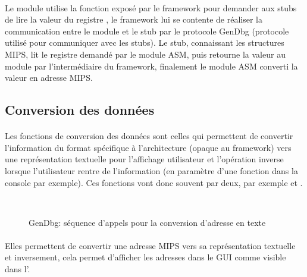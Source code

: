 \documentclass[11pt, book, english, french, standardlists]{upmethodology-document}
\begin{document}
				\paragraph*{}
					Le module utilise la fonction  exposé par le framework pour demander aux stubs de lire la valeur du registre , le framework lui se contente de réaliser la communication entre le module et le stub par le protocole GenDbg (protocole utilisé pour communiquer avec les stubs). Le stub, connaissant les structures MIPS, lit le registre demandé par le module ASM, puis retourne la valeur au module par l'intermédiaire du framework, finalement le module ASM converti la valeur en adresse MIPS.
			\subsection{Conversion des données}
				\paragraph*{}
					Les fonctions de conversion des données sont celles qui permettent de convertir l'information du format spécifique à l'architecture (opaque au framework) vers une représentation textuelle pour l'affichage utilisateur et l'opération inverse lorsque l'utilisateur rentre de l'information (en paramètre d'une fonction dans la console par exemple). Ces fonctions vont donc souvent par deux, par exemple  et .
				\begin{figure}[H]
					\centering
					\\
					\vspace{5pt}
					\caption{GenDbg: séquence d'appels pour la conversion d'adresse en texte}
					\label{fig:GenDbg_sequence_AddressToTxt}
				\end{figure}
				\paragraph*{}
					Elles permettent de convertir une adresse MIPS vers sa représentation textuelle et inversement, cela permet d'afficher les adresses dans le \gls{GUI} comme visible dans l'.
\end{document}
